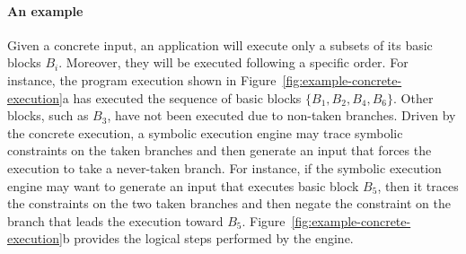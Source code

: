 \paragraph{An example} Given a concrete input, an application will execute only a subsets of its basic blocks $B_i$. Moreover, they will be executed following a specific order. For instance, the program execution shown in Figure~\ref{fig:example-concrete-execution}a has executed the sequence of basic blocks $\{B_1, B_2, B_4, B_6\}$. Other blocks, such as $B_3$, have not been executed due to non-taken branches. Driven by the concrete execution, a symbolic execution engine may trace symbolic constraints on the taken branches and then generate an input that forces the execution to take a never-taken branch. For instance, if the symbolic execution engine may want to generate an input that executes basic block $B_5$, then it traces the constraints on the two taken branches and then negate the constraint on the branch that leads the execution toward $B_5$. Figure~\ref{fig:example-concrete-execution}b provides the logical steps performed by the engine.

